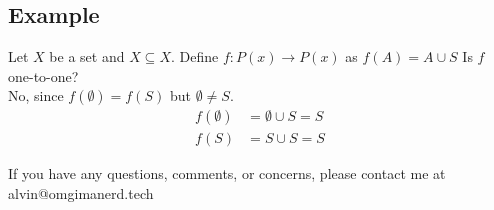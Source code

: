 \documentclass[letterpaper, 12pt]{math}
\begin{document}
\subsection*{Example}
Let \( X \) be a set and \( X \subseteq X \). Define \( f:P(x)\to P(x) \) as
\( f(A) = A \cup S \) Is \( f \) one-to-one? \\
No, since \( f(\emptyset) = f(S) \) but \( \emptyset \neq S \).
\begin{align*}
  f(\emptyset) &= \emptyset \cup S = S \\
  f(S) &= S \cup S = S
\end{align*}

\begin{center}
  If you have any questions, comments, or concerns, please contact me at
  alvin@omgimanerd.tech
\end{center}
\end{document}
